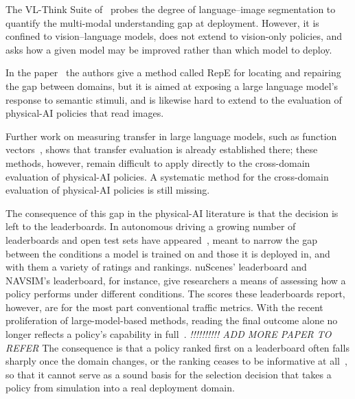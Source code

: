 The VL-Think Suite of~\cite{kachaev2025don} probes the degree of language--image segmentation to
quantify the multi-modal understanding gap at deployment. However, it is confined to vision--language
models, does not extend to vision-only policies, and asks how a given model may be improved rather
than which model to deploy.

In the paper~\cite{zou2023repe} the authors give a method called RepE for locating and repairing the gap
between domains, but it is aimed at exposing a large language model's response to semantic stimuli,
and is likewise hard to extend to the evaluation of physical-AI policies that read images.

Further work on measuring transfer in large language models, such as function
vectors~\cite{TODO-funcvec}, shows that transfer evaluation is already established there; these
methods, however, remain difficult to apply directly to the cross-domain evaluation of physical-AI
policies. A systematic method for the cross-domain evaluation of physical-AI policies is still
missing.

The consequence of this gap in the physical-AI literature is that the decision is left to the
leaderboards. In autonomous driving a growing number of leaderboards and open test sets have
appeared~\cite{caesar2020nuscenes,caesar2021nuplan,dauner2024navsim}, meant to narrow the gap between
the conditions a model is trained on and those it is deployed in, and with them a variety of ratings
and rankings. nuScenes' leaderboard and NAVSIM's leaderboard, for instance, give researchers a means
of assessing how a policy performs under different conditions. The scores these leaderboards report,
however, are for the most part conventional traffic metrics. With the recent proliferation of
large-model-based methods, reading the final outcome alone no longer reflects a policy's capability in
full~\cite{li2024egostatus,codevilla2019exploring,geirhos2020shortcut}.
\emph{!!!!!!!!!! ADD MORE PAPER TO REFER}
The consequence is that a policy ranked first on a leaderboard often falls sharply once the domain changes, or the ranking
ceases to be informative at all~\cite{hendrycks2019benchmarking,xie2023robobev}, so that it cannot
serve as a sound basis for the selection decision that takes a policy from simulation into a real
deployment domain.

